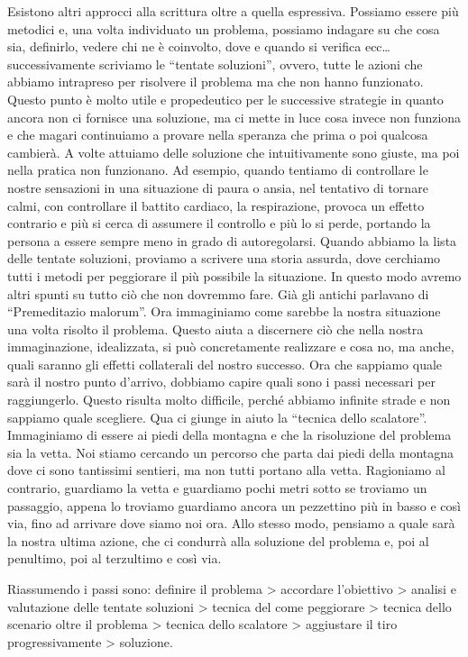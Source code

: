 \documentclass[12pt]{book} %
\begin{document}
Esistono altri approcci alla scrittura oltre a quella espressiva. Possiamo essere più metodici e, una volta individuato
un problema, possiamo indagare su che cosa sia, definirlo, vedere chi ne è coinvolto, dove e quando si verifica ecc…
successivamente scriviamo le “tentate soluzioni”, ovvero, tutte le azioni che abbiamo intrapreso per risolvere il
problema ma che non hanno funzionato. Questo punto è molto utile e propedeutico per le successive strategie in quanto
ancora non ci fornisce una soluzione, ma ci mette in luce cosa invece non funziona e che magari continuiamo a provare
nella speranza che prima o poi qualcosa cambierà. A volte attuiamo delle soluzione che intuitivamente sono giuste, ma
poi nella pratica non funzionano. Ad esempio, quando tentiamo di controllare le nostre sensazioni in una situazione di
paura o ansia, nel tentativo di tornare calmi, con controllare il battito cardiaco, la respirazione, provoca un effetto
contrario e più si cerca di assumere il controllo e più lo si perde, portando la persona a essere sempre meno in grado
di autoregolarsi. Quando abbiamo la lista delle tentate soluzioni, proviamo a scrivere una storia assurda, dove
cerchiamo tutti i metodi per peggiorare il più possibile la situazione. In questo modo avremo altri spunti su tutto ciò
che non dovremmo fare. Già gli antichi parlavano di “Premeditazio malorum”. Ora immaginiamo come sarebbe la nostra
situazione una volta risolto il problema. Questo aiuta a discernere ciò che nella nostra immaginazione, idealizzata, si
può concretamente realizzare e cosa no, ma anche, quali saranno gli effetti collaterali del nostro successo. Ora che
sappiamo quale sarà il nostro punto d'arrivo, dobbiamo capire quali sono i passi necessari per
raggiungerlo. Questo risulta molto difficile, perché abbiamo infinite strade e non sappiamo quale scegliere. Qua ci
giunge in aiuto la “tecnica dello scalatore”. Immaginiamo di essere ai piedi della montagna e che la risoluzione del
problema sia la vetta. Noi stiamo cercando un percorso che parta dai piedi della montagna dove ci sono tantissimi
sentieri, ma non tutti portano alla vetta. Ragioniamo al contrario, guardiamo la vetta e guardiamo pochi metri sotto se
troviamo un passaggio, appena lo troviamo guardiamo ancora un pezzettino più in basso e così via, fino ad arrivare dove
siamo noi ora. Allo stesso modo, pensiamo a quale sarà la nostra ultima azione, che ci condurrà alla soluzione del
problema e, poi al penultimo, poi al terzultimo e così via. 

Riassumendo i passi sono: definire il problema {\textgreater} accordare l'obiettivo {\textgreater} analisi e valutazione
delle tentate soluzioni {\textgreater} tecnica del come peggiorare {\textgreater} tecnica dello scenario oltre il
problema {\textgreater} tecnica dello scalatore {\textgreater} aggiustare il tiro progressivamente {\textgreater}
soluzione.
\end{document}
